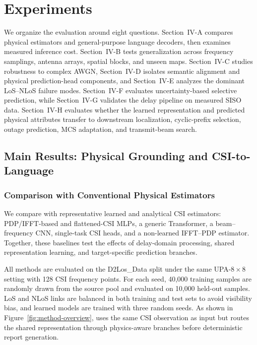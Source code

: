 \section{Experiments}

We organize the evaluation around eight questions. Section~IV-A compares physical estimators and
general-purpose language decoders, then examines measured inference cost. Section~IV-B tests
generalization across frequency samplings, antenna arrays, spatial blocks, and unseen maps.
Section~IV-C studies robustness to complex AWGN, Section~IV-D isolates semantic alignment and physical
prediction-head components, and Section~IV-E analyzes the dominant LoS--NLoS failure modes.
Section~IV-F evaluates uncertainty-based selective prediction, while Section~IV-G validates the delay
pipeline on measured SISO data. Section~IV-H evaluates whether the learned representation and predicted
physical attributes transfer to downstream localization, cyclic-prefix selection, outage prediction,
MCS adaptation, and transmit-beam search.

\subsection{Main Results: Physical Grounding and CSI-to-Language}

\subsubsection{Comparison with Conventional Physical Estimators}

We compare \model{} with representative learned and analytical CSI estimators: PDP/IFFT-based and
flattened-CSI MLPs, a generic Transformer, a beam--frequency CNN, single-task CSI heads, and a
non-learned IFFT--PDP estimator. Together, these baselines test the effects of delay-domain processing,
shared representation learning, and target-specific prediction branches.

All methods are evaluated on the D2Los\_Data split under the same UPA-$8{\times}8$ setting with
128 CSI frequency points. For each seed, 40,000 training samples are randomly drawn from the source
pool and evaluated on 10,000 held-out samples. LoS and NLoS links are balanced in both training and
test sets to avoid visibility bias, and learned models are trained with three random seeds. As shown
in Figure~\ref{fig:method-overview}, \model{} uses the same CSI observation as input but routes the
shared representation through physics-aware branches before deterministic report generation.

